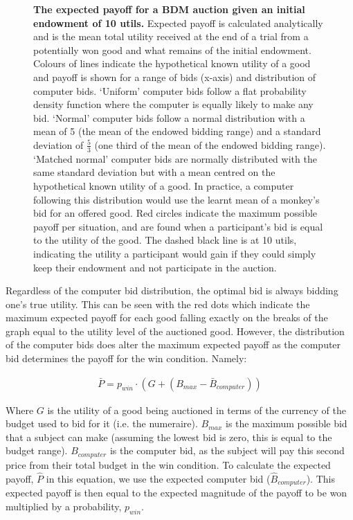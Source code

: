\begin{figure}[p] 
\centering    

\caption[The expected payoff for a BDM auction given an initial endowment of 10 utils.]{\textbf{The expected payoff for a BDM auction given an initial endowment of 10 utils.} Expected payoff is calculated analytically and is the mean total utility received at the end of a trial from a potentially won good and what remains of the initial endowment. Colours of lines indicate the hypothetical known utility of a good and payoff is shown for a range of bids (x-axis) and distribution of computer bids. ‘Uniform’ computer bids follow a flat probability density function where the computer is equally likely to make any bid. ‘Normal’ computer bids follow a normal distribution with a mean of 5 (the mean of the endowed bidding range) and a standard deviation of $\frac{5}{3}$ (one third of the mean of the endowed bidding range). ‘Matched normal’ computer bids are normally distributed with the same standard deviation but with a mean centred on the hypothetical known utility of a good. In practice, a computer following this distribution would use the learnt mean of a monkey's bid for an offered good. Red circles indicate the maximum possible payoff per situation, and are found when a participant’s bid is equal to the utility of the good. The dashed black line is at 10 utils, indicating the utility a participant would gain if they could simply keep their endowment and not participate in the auction.}
\label{fig:bdm_payoff}
\end{figure}

Regardless of the computer bid distribution, the optimal bid is always bidding one’s true utility. This can be seen with the red dots which indicate the maximum expected payoff for each good falling exactly on the breaks of the graph equal to the utility level of the auctioned good. However, the distribution of the computer bids does alter the maximum expected payoff as the computer bid determines the payoff for the win condition. Namely:

\begin{equation}
\begin{aligned}
\bar{P} = p_{win} \cdot (G + (B_{max} - \bar{B}_{computer}))
\end{aligned}
\label{eq:bdm_simulation_payoff}
\end{equation}

Where $G$ is the utility of a good being auctioned in terms of the currency of the budget used to bid for it (i.e. the numeraire). $B_{max}$ is the maximum possible bid that a subject can make (assuming the lowest bid is zero, this is equal to the budget range). $B_{computer}$ is the computer bid, as the subject will pay this second price from their total budget in the win condition. To calculate the expected payoff, $\hat{P}$ in this equation, we use the expected computer bid ($\hat{B}_{computer}$). This expected payoff is then equal to the expected magnitude of the payoff to be won multiplied by a probability, $p_{win}$.

